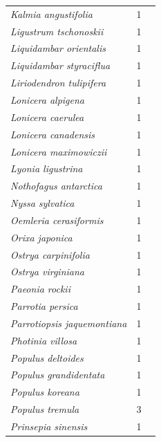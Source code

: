 \documentclass[11pt]{article}
\begin{document}
\begin{longtable}{p{}p{}p{}}
  \emph{Kalmia angustifolia} &   1 & \emph{\citep{flynn2018}} \\ 
  \emph{Ligustrum tschonoskii} &   1 & \emph{\citep{zohner2016}} \\ 
  \emph{Liquidambar orientalis} &   1 & \emph{\citep{zohner2016}} \\ 
  \emph{Liquidambar styraciflua} &   1 & \emph{\citep{zohner2016}} \\ 
  \emph{Liriodendron tulipifera} &   1 & \emph{\citep{zohner2016}} \\ 
  \emph{Lonicera alpigena} &   1 & \emph{\citep{zohner2016}} \\ 
  \emph{Lonicera caerulea} &   1 & \emph{\citep{zohner2016}} \\ 
  \emph{Lonicera canadensis} &   1 & \emph{\citep{flynn2018}} \\ 
  \emph{Lonicera maximowiczii} &   1 & \emph{\citep{zohner2016}} \\ 
  \emph{Lyonia ligustrina} &   1 & \emph{\citep{flynn2018}} \\ 
  \emph{Nothofagus antarctica} &   1 & \emph{\citep{zohner2016}} \\ 
  \emph{Nyssa sylvatica} &   1 & \emph{\citep{flynn2018}} \\ 
  \emph{Oemleria cerasiformis} &   1 & \emph{\citep{zohner2016}} \\ 
  \emph{Orixa japonica} &   1 & \emph{\citep{zohner2016}} \\ 
  \emph{Ostrya carpinifolia} &   1 & \emph{\citep{zohner2016}} \\ 
  \emph{Ostrya virginiana} &   1 & \emph{\citep{zohner2016}} \\ 
  \emph{Paeonia rockii} &   1 & \emph{\citep{zohner2016}} \\ 
  \emph{Parrotia persica} &   1 & \emph{\citep{zohner2016}} \\ 
  \emph{Parrotiopsis jaquemontiana} &   1 & \emph{\citep{zohner2016}} \\ 
  \emph{Photinia villosa} &   1 & \emph{\citep{zohner2016}} \\ 
  \emph{Populus deltoides} &   1 & \emph{\citep{Thielges:1976aa}} \\ 
  \emph{Populus grandidentata} &   1 & \emph{\citep{flynn2018}} \\ 
  \emph{Populus koreana} &   1 & \emph{\citep{zohner2016}} \\ 
  \emph{Populus tremula} &   3 & \emph{\citep{Heide:1993,Laube:2014a,Laube:2014b}} \\ 
  \emph{Prinsepia sinensis} &   1 & \emph{\citep{zohner2016}} \\ 

\end{longtable}
\end{document}
